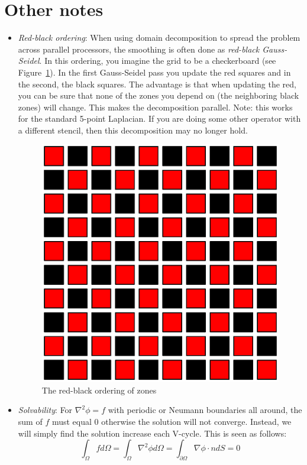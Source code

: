 \section{Other notes}

\label{sec:multigrid:other}

\begin{itemize}

\item {\em Red-black ordering}: When using domain decomposition to
  spread the problem across parallel processors, the smoothing is
  often done as {\em red-black Gauss-Seidel}.  In this ordering, you
  imagine the grid to be a checkerboard (see Figure~\ref{fig:rb}).  In
  the first Gauss-Seidel pass you update the red squares and in the
  second, the black squares.  The advantage is that when updating the
  red, you can be sure that none of the zones you depend on (the
  neighboring black zones) will change.  This makes the decomposition
  parallel.  Note: this works for the standard 5-point Laplacian.  If
  you are doing some other operator with a different stencil, then
  this decomposition may no longer hold.

  \begin{figure}[t]
    \centering
    \includegraphics[width=0.6\linewidth]{rb}
    \caption{\label{fig:rb} The red-black ordering of zones}
  \end{figure}

\item {\em Solvability}: For $\nabla^2 \phi = f$ with periodic or
  Neumann boundaries all around, the sum of $f$ must equal $0$
  otherwise the solution will not converge.  Instead, we will simply
  find the solution increase each V-cycle.  This is seen as follows:
\begin{equation}
\int_\Omega f d\Omega = \int_\Omega \nabla^2 \phi d\Omega =
\int_{\partial \Omega} \nabla \phi \cdot n dS = 0
\end{equation}


\end{itemize}

